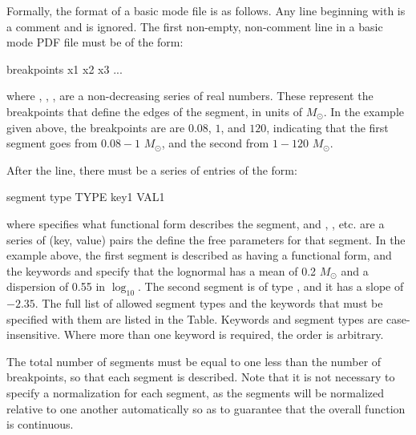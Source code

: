 \documentclass[letterpaper,10pt,english]{sphinxmanual}
\begin{document}
Formally, the format of a basic mode file is as follows. Any line beginning with \sphinxcode{\#} is a comment and is ignored. The first non-empty, non-comment line in a basic mode PDF file must be of the form:

\begin{sphinxVerbatim}[commandchars=\\\{\}]
breakpoints x1 x2 x3 ...
\end{sphinxVerbatim}

where , , ,  are a non-decreasing series of real numbers. These represent the breakpoints that define the edges of the segment, in units of \(M_\odot\). In the example given above, the breakpoints are are \(0.08\), \(1\), and \(120\), indicating that the first segment goes from \(0.08 - 1\) \(M_\odot\), and the second from \(1 - 120\) \(M_\odot\).

After the  line, there must be a series of entries of the form:

\begin{sphinxVerbatim}[commandchars=\\\{\}]
segment
type TYPE
key1 VAL1
\end{sphinxVerbatim}

where  specifies what functional form describes the segment, and , , etc. are a series of (key, value) pairs the define the free parameters for that segment. In the example above, the first segment is described as having a  functional form, and the keywords  and  specify that the lognormal has a mean of 0.2 \(M_\odot\) and a dispersion of 0.55 in \(\log_{10}\). The second segment is of type , and it has a slope of \(-2.35\). The full list of allowed segment types and the keywords that must be specified with them are listed in the {\hyperref[\detokenize{pdfs:tab-segtypes}]{}} Table. Keywords and segment types are case-insensitive. Where more than one keyword is required, the order is arbitrary.

The total number of segments must be equal to one less than the number of breakpoints, so that each segment is described. Note that it is not necessary to specify a normalization for each segment, as the segments will be normalized relative to one another automatically so as to guarantee that the overall function is continuous.
\end{document}
